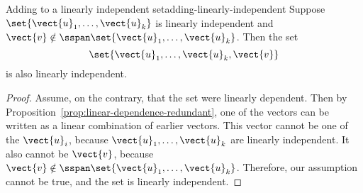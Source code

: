 \begin{proposition}{Adding to a linearly independent set}{adding-linearly-independent}
  Suppose $\set{\vect{u}_1,\ldots,\vect{u}_k}$ is linearly
  independent and
  $\vect{v}\notin \sspan\set{\vect{u}_1,\ldots,\vect{u}_k}$. Then
  the set
  \begin{equation*}
    \set{\vect{u}_1,\ldots,\vect{u}_k,\vect{v}}
  \end{equation*}
  is also linearly independent.
\end{proposition}

\begin{proof}
  Assume, on the contrary, that the set were linearly dependent. Then
  by Proposition~\ref{prop:linear-dependence-redundant}, one of the
  vectors can be written as a linear combination of earlier vectors.
  This vector cannot be one of the $\vect{u}_i$, because
  $\vect{u}_1,\ldots,\vect{u}_k$ are linearly independent.  It
  also cannot be $\vect{v}$, because
  $\vect{v}\notin
  \sspan\set{\vect{u}_1,\ldots,\vect{u}_k}$. Therefore, our
  assumption cannot be true, and the set is linearly independent.
\end{proof}
